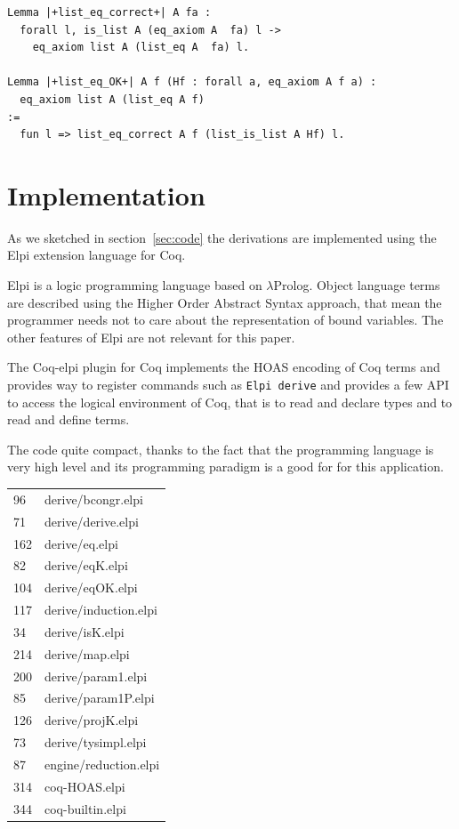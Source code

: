 \documentclass[sigplan,10pt,review]{acmart}\settopmatter{printfolios=true,printccs=false,printacmref=false}
\begin{document}
\begin{lstlisting}
Lemma |+list_eq_correct+| A fa :
  forall l, is_list A (eq_axiom A  fa) l ->
    eq_axiom list A (list_eq A  fa) l.

Lemma |+list_eq_OK+| A f (Hf : forall a, eq_axiom A f a) :
  eq_axiom list A (list_eq A f)
:=
  fun l => list_eq_correct A f (list_is_list A Hf) l.
\end{lstlisting}


\section{Implementation} %
\label{sec:elpi}

As we sketched in section~\ref{sec:code} the derivations are
implemented using the Elpi extension language for Coq.

Elpi is a logic programming language based on $\lambda$Prolog.
Object language terms are described using the Higher Order Abstract
Syntax approach, that mean the programmer needs not to care about the
representation of bound variables. The other features of Elpi
are not relevant for this paper.

The Coq-elpi plugin for Coq implements the HOAS encoding of Coq
terms and provides way to register commands such as
\lstinline+Elpi derive+ and provides a few API to access the
logical environment of Coq, that is to read and declare
types and to read and define terms.

The code quite compact, thanks to the fact that the programming
language is very high level and its programming paradigm is a good
for for this application.

\begin{tabular}{ll}
   96 & derive/bcongr.elpi\\
   71 & derive/derive.elpi\\
  162 & derive/eq.elpi\\
   82 & derive/eqK.elpi\\
  104 & derive/eqOK.elpi\\
  117 & derive/induction.elpi\\
   34 & derive/isK.elpi\\
  214 & derive/map.elpi\\
  200 & derive/param1.elpi\\
   85 & derive/param1P.elpi\\
  126 & derive/projK.elpi\\
   73 & derive/tysimpl.elpi\\
   87 & engine/reduction.elpi\\
  314 & coq-HOAS.elpi \\
  344 & coq-builtin.elpi
\end{tabular}
\end{document}

